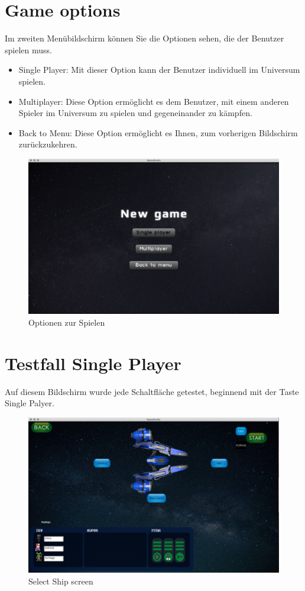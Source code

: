 \documentclass[11pt]{article}
\begin{document}
\section{Game options}
Im zweiten Menübildschirm können Sie die Optionen sehen, die der Benutzer spielen muss.
\begin{itemize}
\item Single Player: Mit dieser Option kann der Benutzer individuell im Universum spielen.
\item Multiplayer: Diese Option ermöglicht es dem Benutzer, mit einem anderen Spieler im Universum zu spielen und gegeneinander zu kämpfen.
\item Back to Menu: Diese Option ermöglicht es Ihnen, zum vorherigen Bildschirm zurückzukehren.
\end{itemize}
\begin{figure}[h]
\centering
\includegraphics[scale=0.3]{TestProtocolBilder/menuScreenTwo.png}
\caption{Optionen zur Spielen}
\end{figure}
\newpage
\section{Testfall Single Player}
Auf diesem Bildschirm wurde jede Schaltfläche getestet, beginnend mit der Taste Single Palyer.\\
\begin{figure}[h]
\centering
\includegraphics[scale=0.3]{TestProtocolBilder/selecShipScreen.png}
\caption{Select Ship screen}
\end{figure}
\newpage
\end{document}
